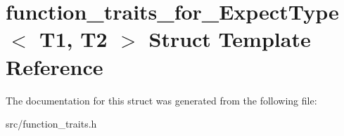 \hypertarget{structfunction__traits__for___expect_type}{\section{function\-\_\-traits\-\_\-for\-\_\-\-Expect\-Type$<$ T1, T2 $>$ Struct Template Reference}
\label{structfunction__traits__for___expect_type}
}


The documentation for this struct was generated from the following file\-:\begin{DoxyCompactItemize}
\item 
src/function\-\_\-traits.\-h\end{DoxyCompactItemize}
